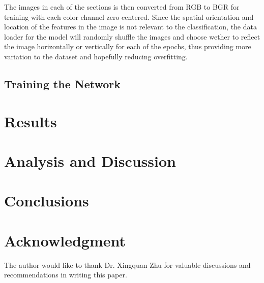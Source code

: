 \documentclass[conference]{IEEEtran}
\begin{document}
The images in each of the sections is then converted from RGB to BGR for training with each color channel zero-centered. Since the spatial orientation and location of the features in the image is not relevant to the classification, the data loader for the model will randomly shuffle the images and choose wether to reflect the image horizontally or vertically for each of the epochs, thus providing more variation to the dataset and hopefully reducing overfitting.

\subsection{Training the Network}

\section{Results}

\section{Analysis and Discussion}

\section{Conclusions}

\section*{Acknowledgment}
The author would like to thank Dr. Xingquan Zhu for valuable discussions and recommendations in writing this paper.


\end{document}
